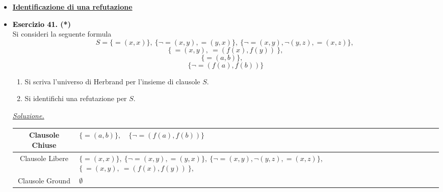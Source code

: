 \documentclass[a4paper,10pt]{article}
\begin{document}
    {\normalsize
    \begin{itemize}[label=, leftmargin=0pt]
    

    
    

    \item \textbf{\underline{Identificazione di una refutazione}}


    \item \textbf{\textcolor{black}{Esercizio 41.} (*)} \\ 	
    Si consideri la seguente formula 
    $$S=\{=(x,x)\},\ \{\lnot=(x,y),=(y,x)\},\ \{\lnot =(x,y), \lnot(y,z),=(x,z)\},\ $$
    $$\{\ =(x,y),\ =(f(x),f(y))\ \},$$
    $$\{=(a,b)\},\quad $$ $$\{\lnot =(f(a),f(b))\}$$
    
    \begin{enumerate}
        \item Si scriva l'universo di Herbrand per l'insieme di clausole $S$.
        \item Si identifichi una refutazione per $S$.
    \end{enumerate}

    \begin{osservazioni}
    \underline{\textit{Soluzione.}}\\    
    \begin{table}[H]
    \centering
    \small 
    \renewcommand{\arraystretch}{1.5} 
    
    \begin{tabularx}{\textwidth}{|c|>{\centering\arraybackslash}X|}
        \hline
        Clausole Chiuse & $\{=(a,b)\},\quad $$ $$\{\lnot =(f(a),f(b))\}$ \\
        \hline
        Clausole Libere & 
            $\{=(x,x)\},\ \{\lnot=(x,y),=(y,x)\},\ \{\lnot =(x,y), \lnot(y,z),=(x,z)\},$\newline
            $\{\ =(x,y),\ =(f(x),f(y))\ \},$
            \\
        \hline
        Clausole Ground & $\emptyset$ \\
        \hline
    \end{tabularx}
    \end{table}


\end{osservazioni}
\end{itemize}}
\end{document}

